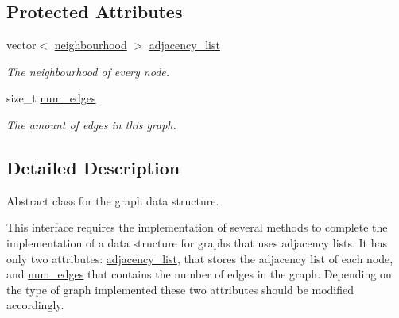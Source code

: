 \subsection*{Protected Attributes}
\begin{DoxyCompactItemize}
\item 
\hypertarget{classlgraph_1_1utils_1_1xxgraph_a1d5fda0d5aa89340f997428b982f966f}{vector$<$ \hyperlink{namespacelgraph_1_1utils_a0f2ef47028a466d26841709e705390ac}{neighbourhood} $>$ \hyperlink{classlgraph_1_1utils_1_1xxgraph_a1d5fda0d5aa89340f997428b982f966f}{adjacency\-\_\-list}}\label{classlgraph_1_1utils_1_1xxgraph_a1d5fda0d5aa89340f997428b982f966f}

\begin{DoxyCompactList}\small\item\em The neighbourhood of every node. \end{DoxyCompactList}\item 
\hypertarget{classlgraph_1_1utils_1_1xxgraph_a217ebb1cd8946fedfbf94a9b22f7da48}{size\-\_\-t \hyperlink{classlgraph_1_1utils_1_1xxgraph_a217ebb1cd8946fedfbf94a9b22f7da48}{num\-\_\-edges}}\label{classlgraph_1_1utils_1_1xxgraph_a217ebb1cd8946fedfbf94a9b22f7da48}

\begin{DoxyCompactList}\small\item\em The amount of edges in this graph. \end{DoxyCompactList}\end{DoxyCompactItemize}


\subsection{Detailed Description}
Abstract class for the graph data structure. 

This interface requires the implementation of several methods to complete the implementation of a data structure for graphs that uses adjacency lists. It has only two attributes\-: \hyperlink{classlgraph_1_1utils_1_1xxgraph_a1d5fda0d5aa89340f997428b982f966f}{adjacency\-\_\-list}, that stores the adjacency list of each node, and \hyperlink{classlgraph_1_1utils_1_1xxgraph_a217ebb1cd8946fedfbf94a9b22f7da48}{num\-\_\-edges} that contains the number of edges in the graph. Depending on the type of graph implemented these two attributes should be modified accordingly. 

